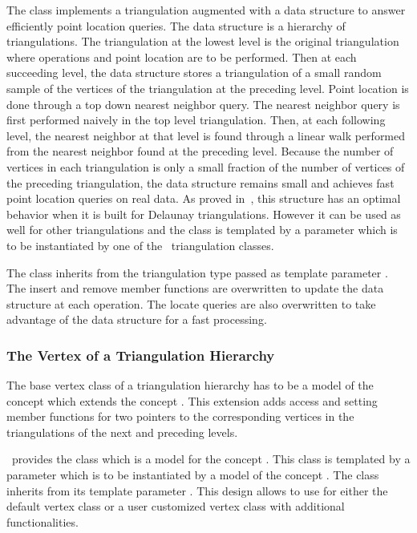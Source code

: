 The class 
implements a triangulation augmented with
a data structure to answer efficiently  point location queries.
The data structure is a hierarchy 
of triangulations. The triangulation at the lowest level is
the original triangulation where operations and point location are to 
be performed.
Then at each succeeding level, the data structure
stores a triangulation of a small random sample of the vertices
of the triangulation at the preceding level. Point location
is done through a top down nearest neighbor query.
The nearest neighbor query is first
performed naively in the top level triangulation.
Then, at each following level, the nearest neighbor at that level
is found through a linear walk performed from
the nearest neighbor found at the preceding level.
Because the number of vertices in each triangulation is only a small
fraction of the number of vertices of the preceding triangulation,
the data structure remains small and achieves fast point location 
queries  on real
data. As proved in~\cite{d-iirdt-98}, this structure has an optimal behavior
when it is built for Delaunay triangulations.
However it can be used as well for other triangulations
and the class  is templated by a parameter
which is to be instantiated by one of the \cgal\ triangulation
classes. 

The class  inherits from the
triangulation type passed as template parameter . 
The insert and remove member functions
are  overwritten to update the data structure at each operation.
The locate queries are also overwritten to take advantage of the data
structure for a fast processing.

\subsubsection{The Vertex of a Triangulation Hierarchy}
The base vertex class  of a triangulation hierarchy 
has to be a model of the
concept
 which extends
the concept .
This extension adds
access and setting member functions 
for two pointers  to the corresponding vertices in the 
triangulations of the next and preceding levels.

\cgal\ provides the class 
which is a model for the concept 
.
This class is templated by a parameter 
which is to be instantiated by a model of  the concept
.
The class  inherits
from its template parameter .
This design allows to use for   
either the default
vertex class or a user customized
vertex class with additional functionalities.

